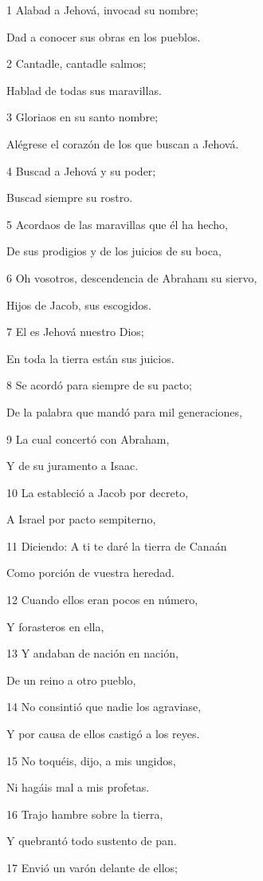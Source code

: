 \par 1 Alabad a Jehová, invocad su nombre;
\par Dad a conocer sus obras en los pueblos.
\par 2 Cantadle, cantadle salmos;
\par Hablad de todas sus maravillas.
\par 3 Gloriaos en su santo nombre;
\par Alégrese el corazón de los que buscan a Jehová.
\par 4 Buscad a Jehová y su poder;
\par Buscad siempre su rostro.
\par 5 Acordaos de las maravillas que él ha hecho,
\par De sus prodigios y de los juicios de su boca,
\par 6 Oh vosotros, descendencia de Abraham su siervo,
\par Hijos de Jacob, sus escogidos.
\par 7 El es Jehová nuestro Dios;
\par En toda la tierra están sus juicios.
\par 8 Se acordó para siempre de su pacto;
\par De la palabra que mandó para mil generaciones,
\par 9 La cual concertó con Abraham,
\par Y de su juramento a Isaac.
\par 10 La estableció a Jacob por decreto,
\par A Israel por pacto sempiterno,
\par 11 Diciendo: A ti te daré la tierra de Canaán
\par Como porción de vuestra heredad.
\par 12 Cuando ellos eran pocos en número,
\par Y forasteros en ella,
\par 13 Y andaban de nación en nación,
\par De un reino a otro pueblo,
\par 14 No consintió que nadie los agraviase,
\par Y por causa de ellos castigó a los reyes.
\par 15 No toquéis, dijo, a mis ungidos,
\par Ni hagáis mal a mis profetas.
\par 16 Trajo hambre sobre la tierra,
\par Y quebrantó todo sustento de pan.
\par 17 Envió un varón delante de ellos;

